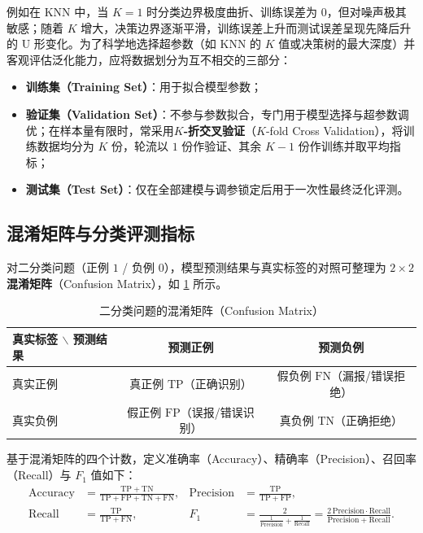例如在 KNN 中，当 $K=1$ 时分类边界极度曲折、训练误差为 $0$，但对噪声极其敏感；随着 $K$ 增大，决策边界逐渐平滑，训练误差上升而测试误差呈现先降后升的 U 形变化。为了科学地选择超参数（如 KNN 的 $K$ 值或决策树的最大深度）并客观评估泛化能力，应将数据划分为互不相交的三部分：
\begin{itemize}
  \item \textbf{训练集（Training Set）}：用于拟合模型参数；
  \item \textbf{验证集（Validation Set）}：不参与参数拟合，专门用于模型选择与超参数调优；在样本量有限时，常采用\textbf{$K$-折交叉验证}（$K$-fold Cross Validation），将训练数据均分为 $K$ 份，轮流以 $1$ 份作验证、其余 $K-1$ 份作训练并取平均指标；
  \item \textbf{测试集（Test Set）}：仅在全部建模与调参锁定后用于一次性最终泛化评测。
\end{itemize}

\subsection{混淆矩阵与分类评测指标}

对二分类问题（正例 $1$ / 负例 $0$），模型预测结果与真实标签的对照可整理为 $2\times 2$ \textbf{混淆矩阵}（Confusion Matrix），如 \cref{tab:confusion-matrix} 所示。

\begin{table}[htbp]
  \centering\small
  \caption{二分类问题的混淆矩阵（Confusion Matrix）}\label{tab:confusion-matrix}
  \begin{tabular}{@{}lcc@{}}
    \toprule
    真实标签 $\backslash$ 预测结果 & 预测正例 & 预测负例 \\
    \midrule
    真实正例 & 真正例 $\mathrm{TP}$（正确识别） & 假负例 $\mathrm{FN}$（漏报/错误拒绝） \\
    真实负例 & 假正例 $\mathrm{FP}$（误报/错误识别） & 真负例 $\mathrm{TN}$（正确拒绝） \\
    \bottomrule
  \end{tabular}
\end{table}

\begin{definition}[分类常用评测指标]\label{def:classification-metrics}
基于混淆矩阵的四个计数，定义准确率（Accuracy）、精确率（Precision）、召回率（Recall）与 $F_1$ 值如下：
\begin{equation}\label{eq:clf-metrics}
\begin{aligned}
  \mathrm{Accuracy} &= \frac{\mathrm{TP} + \mathrm{TN}}{\mathrm{TP} + \mathrm{FP} + \mathrm{TN} + \mathrm{FN}}, &
  \mathrm{Precision} &= \frac{\mathrm{TP}}{\mathrm{TP} + \mathrm{FP}}, \\
  \mathrm{Recall} &= \frac{\mathrm{TP}}{\mathrm{TP} + \mathrm{FN}}, &
  F_1 &= \frac{2}{\frac{1}{\mathrm{Precision}} + \frac{1}{\mathrm{Recall}}} = \frac{2\,\mathrm{Precision}\cdot\mathrm{Recall}}{\mathrm{Precision} + \mathrm{Recall}}.
\end{aligned}
\end{equation}
\end{definition}

